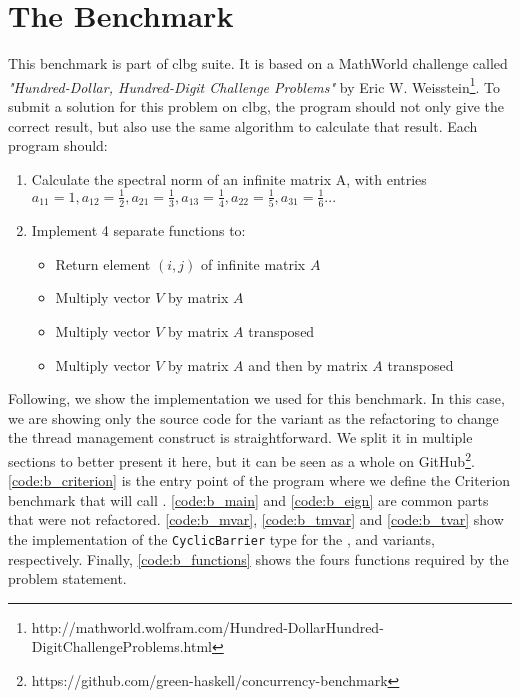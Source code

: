 \chapter{The \spectral Benchmark}\label{ap:benchmark}

This benchmark is part of \acl{clbg} suite. It is based on a MathWorld challenge called \emph{"Hundred-Dollar, Hundred-Digit Challenge Problems"} by Eric W. Weisstein\footnote{http://mathworld.wolfram.com/Hundred-DollarHundred-DigitChallengeProblems.html}. To submit a solution for this problem on \acl{clbg}, the program should not only give the correct result, but also use the same algorithm to calculate that result. Each program should:

\begin{enumerate}
  \item Calculate the spectral norm of an infinite matrix A, with entries $a_{11}=1, a_{12}=\frac{1}{2}, a_{21}=\frac{1}{3}, a_{13}=\frac{1}{4}, a_{22}=\frac{1}{5}, a_{31}=\frac{1}{6}...$
  \item Implement 4 separate functions to:
  \begin{itemize}
    \item Return element $(i,j)$ of infinite matrix $A$
    \item Multiply vector $V$ by matrix $A$
    \item Multiply vector $V$ by matrix $A$ transposed
    \item Multiply vector $V$ by matrix $A$ and then by matrix $A$ transposed
  \end{itemize}
\end{enumerate}

Following, we show the implementation we used for this benchmark. In this case, we are showing only the  source code for the \forkIO variant as the refactoring to change the thread management construct is straightforward. We split it in multiple sections to better present it here, but it can be seen as a whole on GitHub\footnote{https://github.com/green-haskell/concurrency-benchmark}. \autoref{code:b_criterion} is the entry point of the program where we define the Criterion benchmark that will call \spectral. \autoref{code:b_main} and \autoref{code:b_eign} are common parts that were not refactored. \autoref{code:b_mvar}, \autoref{code:b_tmvar} and \autoref{code:b_tvar} show the implementation of the \texttt{CyclicBarrier} type for the \MVar, \TMVar and \TVar variants, respectively. Finally, \autoref{code:b_functions} shows the fours functions required by the problem statement.

